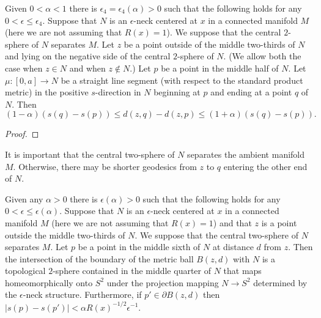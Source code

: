 \begin{lemma}
\label{lem:neck-distance-comparison-external-point}
\label{neckdistcomp}
Given $0<\alpha<1$ there is $\epsilon_4=\epsilon_4(\alpha)>0$ such
that the following holds for any $0<\epsilon\le \epsilon_4$. Suppose
that $N$ is an $\epsilon$-neck centered at $x$ in a connected
manifold $M$ (here we are not assuming that $R(x)=1$). We suppose
that the central $2$-sphere of $N$ separates $M$. Let $z$ be a point
outside of  the middle two-thirds of $N$ and lying on the negative
side of the central $2$-sphere of $N$. (We allow both the case when
$z\in N$ and when $z\not\in N$.) Let $p$ be a point in the middle
half of $N$. Let $\mu\colon [0,a]\to N$ be a straight line segment
(with respect to the standard product metric) in the positive
$s$-direction in $N$ beginning at $p$ and ending at a point $q$ of
$N$. Then
$$(1-\alpha)(s(q)-s(p))\le d(z,q)-d(z,p)\le (1+\alpha)(s(q)-s(p)).$$
\end{lemma}


\begin{proof}
\sketch
\end{proof}



 It is important that the central two-sphere of
$N$ separates the ambient manifold $M$. Otherwise, there may be
shorter geodesics from $z$ to $q$ entering the other end of $N$.

\begin{lemma}
\label{lem:metric-sphere-meets-neck-topologically}
\label{topiso}
Given any $\alpha>0$  there is $\epsilon(\alpha)>0$ such that  the
following holds for any $0<\epsilon\le \epsilon(\alpha)$. Suppose
that $N$ is an $\epsilon$-neck centered at $x$ in a connected
manifold $M$ (here we are not assuming that $R(x)=1$) and that $z$
is a point outside the middle two-thirds of $N$. We suppose that the
central two-sphere of $N$ separates $M$. Let $p$ be a point in the
middle sixth of $N$ at distance $d$ from $z$. Then the intersection
of the boundary of the metric ball $B(z,d)$ with $N$ is a
topological $2$-sphere contained in the middle quarter of $N$ that
maps homeomorphically onto $S^2$ under the projection mapping $N\to
S^2$ determined by the $\epsilon$-neck structure. Furthermore, if
$p'\in \partial B(z,d)$ then $|s(p)-s(p')|<\alpha
R(x)^{-1/2}\epsilon^{-1}$.
\end{lemma}

